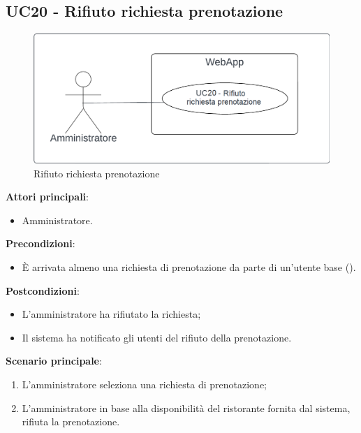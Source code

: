 \subsection{UC20 - Rifiuto richiesta prenotazione}\label{usecase:20}
\begin{figure}[H]
    \centering
    \includegraphics[width=0.9\linewidth]{ucd/ucd20.png}
    \caption{Rifiuto richiesta prenotazione}
\end{figure}
\textbf{Attori principali}:
\begin{itemize}
    \item Amministratore.
\end{itemize}
\textbf{Precondizioni}:
\begin{itemize}
     \item \`E arrivata almeno una richiesta di prenotazione da parte di un'utente base ().
\end{itemize}
\textbf{Postcondizioni}:
\begin{itemize}
    \item L'amministratore ha rifiutato la richiesta;
    \item Il sistema ha notificato gli utenti del rifiuto della prenotazione.
\end{itemize}
\textbf{Scenario principale}:
\begin{enumerate}
    \item L'amministratore seleziona una richiesta di prenotazione;
    \item L'amministratore in base alla disponibilità del ristorante fornita dal sistema, rifiuta la prenotazione.
\end{enumerate}
\newpage
